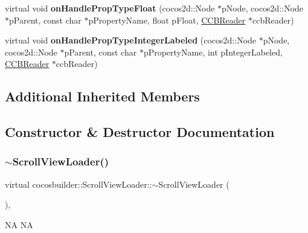 \begin{DoxyCompactItemize}
virtual void {\bfseries on\+Handle\+Prop\+Type\+Float} (cocos2d\+::\+Node $\ast$p\+Node, cocos2d\+::\+Node $\ast$p\+Parent, const char $\ast$p\+Property\+Name, float p\+Float, \hyperlink{classcocosbuilder_1_1CCBReader}{C\+C\+B\+Reader} $\ast$ccb\+Reader)
\item 
\mbox{\label{classcocosbuilder_1_1ScrollViewLoader_a248991d9bc260cd766610bec598f47f9}} 
virtual void {\bfseries on\+Handle\+Prop\+Type\+Integer\+Labeled} (cocos2d\+::\+Node $\ast$p\+Node, cocos2d\+::\+Node $\ast$p\+Parent, const char $\ast$p\+Property\+Name, int p\+Integer\+Labeled, \hyperlink{classcocosbuilder_1_1CCBReader}{C\+C\+B\+Reader} $\ast$ccb\+Reader)
\end{DoxyCompactItemize}
\subsection*{Additional Inherited Members}


\subsection{Constructor \& Destructor Documentation}
\mbox{\label{classcocosbuilder_1_1ScrollViewLoader_a80a67135753e688204e833bfa563c4c7}} 
\subsubsection{\texorpdfstring{$\sim$\+Scroll\+View\+Loader()}{~ScrollViewLoader()}\hspace{0.1cm}{\footnotesize\ttfamily [1/2]}}
{\footnotesize\ttfamily virtual cocosbuilder\+::\+Scroll\+View\+Loader\+::$\sim$\+Scroll\+View\+Loader (\begin{DoxyParamCaption}{ }\end{DoxyParamCaption})\hspace{0.3cm}{\ttfamily [inline]}, {\ttfamily [virtual]}}

NA  NA \mbox{\label{classcocosbuilder_1_1ScrollViewLoader_a80a67135753e688204e833bfa563c4c7}} 
